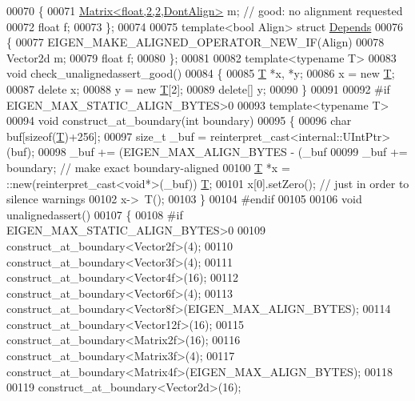\begin{DoxyCode}
00070 \{
00071   \hyperlink{group___core___module}{Matrix<float,2,2,DontAlign>} m; \textcolor{comment}{// good: no alignment requested}
00072   \textcolor{keywordtype}{float} f;
00073 \};
00074 
00075 \textcolor{keyword}{template}<\textcolor{keywordtype}{bool} Align> \textcolor{keyword}{struct }\hyperlink{struct_depends}{Depends}
00076 \{
00077   EIGEN\_MAKE\_ALIGNED\_OPERATOR\_NEW\_IF(Align)
00078   Vector2d m;
00079   \textcolor{keywordtype}{float} f;
00080 \};
00081 
00082 \textcolor{keyword}{template}<\textcolor{keyword}{typename} T>
00083 \textcolor{keywordtype}{void} check\_unalignedassert\_good()
00084 \{
00085   \hyperlink{group___sparse_core___module}{T} *x, *y;
00086   x = \textcolor{keyword}{new} \hyperlink{group___sparse_core___module}{T};
00087   \textcolor{keyword}{delete} x;
00088   y = \textcolor{keyword}{new} \hyperlink{group___sparse_core___module}{T}[2];
00089   \textcolor{keyword}{delete}[] y;
00090 \}
00091 
00092 \textcolor{preprocessor}{#if EIGEN\_MAX\_STATIC\_ALIGN\_BYTES>0}
00093 \textcolor{keyword}{template}<\textcolor{keyword}{typename} T>
00094 \textcolor{keywordtype}{void} construct\_at\_boundary(\textcolor{keywordtype}{int} boundary)
00095 \{
00096   \textcolor{keywordtype}{char} buf[\textcolor{keyword}{sizeof}(\hyperlink{group___sparse_core___module}{T})+256];
00097   \textcolor{keywordtype}{size\_t} \_buf = \textcolor{keyword}{reinterpret\_cast<}internal::UIntPtr\textcolor{keyword}{>}(buf);
00098   \_buf += (EIGEN\_MAX\_ALIGN\_BYTES - (\_buf %
00099   \_buf += boundary; \textcolor{comment}{// make exact boundary-aligned}
00100   \hyperlink{group___sparse_core___module}{T} *x = ::new(reinterpret\_cast<void*>(\_buf)) \hyperlink{group___sparse_core___module}{T};
00101   x[0].setZero(); \textcolor{comment}{// just in order to silence warnings}
00102   x->~T();
00103 \}
00104 \textcolor{preprocessor}{#endif}
00105 
00106 \textcolor{keywordtype}{void} unalignedassert()
00107 \{
00108 \textcolor{preprocessor}{#if EIGEN\_MAX\_STATIC\_ALIGN\_BYTES>0}
00109   construct\_at\_boundary<Vector2f>(4);
00110   construct\_at\_boundary<Vector3f>(4);
00111   construct\_at\_boundary<Vector4f>(16);
00112   construct\_at\_boundary<Vector6f>(4);
00113   construct\_at\_boundary<Vector8f>(EIGEN\_MAX\_ALIGN\_BYTES);
00114   construct\_at\_boundary<Vector12f>(16);
00115   construct\_at\_boundary<Matrix2f>(16);
00116   construct\_at\_boundary<Matrix3f>(4);
00117   construct\_at\_boundary<Matrix4f>(EIGEN\_MAX\_ALIGN\_BYTES);
00118 
00119   construct\_at\_boundary<Vector2d>(16);

\end{DoxyCode}
